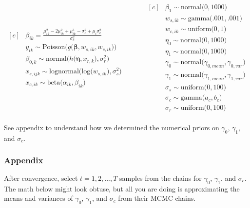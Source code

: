 \documentclass[12pt, oneside]{article}
\begin{document}
\begin{enumerate}[leftmargin=*]
\begin{equation*}
\begin{aligned}[c]
&\beta_{ik} =  \frac{\mu_{ik}^{2} - 2\mu_{ik}^{2} + \mu_{ik}^{3} - \sigma^{2}_{c} + \mu_{i}\sigma^{2}_{c}}{\sigma^{2}_{c}} \\
&y_{ik} \sim \textrm{Poisson} \big(g\big(\bm{\beta}, w_{s,ik}, w_{c,ik}\big)\big) \\
&\beta_{0,k} \sim \textrm{normal} \big(h\big(\bm{\eta}, x_{r,k}\big), \sigma^{2}_{r} \big) \\
&x_{s,ijk} \sim \textrm{lognormal} \big(\textrm{log}\big(w_{s,ik}\big), \sigma^{2}_{s}\big) \\
& x_{c,ik} \sim \textrm{beta}\big(\alpha_{ik}, \beta_{ik}\big) \\
\end{aligned}\quad\quad\quad
\begin{aligned}[c]
&\beta_{1} \sim \textrm{normal} \big(0, 1000) \\
&w_{s,ik} \sim \textrm{gamma} \big(.001, .001) \\
&w_{c,ik} \sim \textrm{uniform} \big(0, 1) \\
&\eta_{0} \sim \textrm{normal} \big(0, 1000) \\
&\eta_{1} \sim \textrm{normal} \big(0, 1000) \\
&\gamma_{0} \sim \textrm{normal} \big( \gamma_{0,mean}, \gamma_{0,var}) \\
&\gamma_{1} \sim \textrm{normal} \big( \gamma_{1,mean}, \gamma_{1,var}) \\
&\sigma_{s} \sim \textrm{uniform} \big(0, 100) \\
&\sigma_{c} \sim \textrm{gamma} \big(a_{c},b_{c}\big)\\
&\sigma_{r} \sim \textrm{uniform} \big(0, 100) \\
\end{aligned}
\end{equation*}

\vspace{10 mm}
See appendix to understand how we determined the numerical priors on $\gamma_{0}$, $\gamma_{1}$, and $\sigma_{c}$.
\newpage

\subsubsection*{Appendix}

After convergence, select $t=1,2,...,T$ samples from the chains for $\gamma_{0}$, $\gamma_{1}$,  and $\sigma_{c}$. The math below might look obtuse, but all you are doing is approximating the means and variances of $\gamma_{0}$, $\gamma_{1}$,  and $\sigma_{c}$ from their MCMC chains. 


\end{enumerate}
\end{document}
